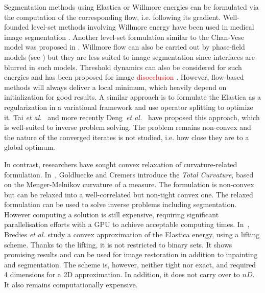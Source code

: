 \documentclass[smallextended]{svjour3}       %
\newcommand{\revision}[1]{\textcolor{red}{#1}}
\begin{document}



Segmentation methods using Elastica or Willmore energies can be
formulated via the computation of the corresponding flow,
i.e. following its gradient. Well-founded level-set methods involving
Willmore energy \cite{droske2004level} have been used in medical image
segmentation \cite{lim2012introducing}. Another level-set formulation
similar to the Chan-Vese model was proposed in
\cite{zhu2013image}. Willmore flow can also be carried out by
phase-field models (see \cite{bretin2015phase}) but they are less
suited to image segmentation since interfaces are blurred in such
models. Threshold dynamics can also be considered for such energies
\cite{esedoglu2008threshold} and has been proposed for image
\revision{disocclusion} \cite{esedoglu2005threshold}. However, flow-based methods
will always deliver a local minimum, which heavily depend on
initialization for good results. A similar approach is to formulate
the Elastica as a regularization in a variational framework and use
operator splitting to optimize it. Tai {\em et
  al.}~\cite{tai11elastica} and more recently Deng~{\em et
  al.}~\cite{deng2019new} have proposed this approach, which is
well-suited to inverse problem solving. The problem remains non-convex
and the nature of the converged iterates is not studied, i.e. how
close they are to a global optimum.

In contrast, researchers have sought convex relaxation of curvature-related
formulation. In~\cite{goldluecke11totalcurvature}, Goldluecke and Cremers introduce the {\em Total Curvature}, based
on the Menger-Melnikov curvature of a measure. The formulation is non-convex but can be relaxed into a well-correlated
but non-tight convex one. The relaxed formulation can be used to solve inverse problems including segmentation. However computing a solution is still expensive, requiring significant parallelisation efforts with a GPU to achieve
  acceptable computing times. In~\cite{bredies15convex}, Bredies {\em et al.} study a convex approximation of the
  Elastica energy, using a lifting scheme. Thanks to the lifting, it is not restricted to binary sets. It shows
  promising results and can be used for image restoration in addition to inpainting and segmentation. The scheme is,
  however, neither tight nor exact, and required 4 dimensions for a 2D approximation. In addition, it does not carry over
to $nD$. It also remains computationally expensive.
\end{document}
